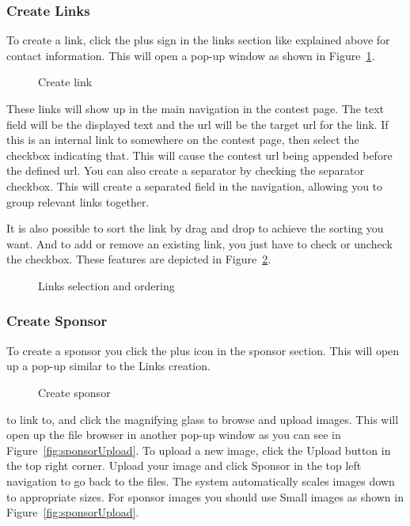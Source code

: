 \subsubsection{Create Links}

To create a link, click the plus sign in the links section like
explained above for contact information. This will open a pop-up window
as shown in Figure~\ref{fig:createLink}.

\begin{figure}
\centering
	\caption{Create link}
	\label{fig:createLink}
\end{figure}

These links will show up in the main navigation in the contest page. The
text field will be the displayed text and the url will be the target
url for the link. If this is an internal link to somewhere on the
contest page, then select the checkbox indicating that. This will cause
the contest url being appended before the defined url. You can also
create a separator by checking the separator checkbox. This will create
a separated field in the navigation, allowing you to group relevant
links together.

It is also possible to sort the link by drag and drop to achieve the
sorting you want. And to add or remove an existing link, you just have
to check or uncheck the checkbox. These features are depicted in Figure~\ref{fig:linkSelectOrder}.

\begin{figure}
\centering
	\caption{Links selection and ordering}
	\label{fig:linkSelectOrder}
\end{figure}

\subsubsection{Create Sponsor}

To create a sponsor you click the plus icon in the sponsor section. This
will open up a pop-up similar to the Links creation. 

\begin{figure}
\centering
 	\caption{Create sponsor}
 	\label{fig:createSponsor}
\end{figure}

to link to, and click the magnifying glass to browse and upload images.
This will open up the file browser in another pop-up window as you can
see in Figure~\ref{fig:sponsorUpload}. To upload a new image, click the Upload button in
the top right corner. Upload your image and click Sponsor in the top
left navigation to go back to the files. The system automatically
scales images down to appropriate sizes. For sponsor images you should
use Small images as shown in Figure~\ref{fig:sponsorUpload}. 

